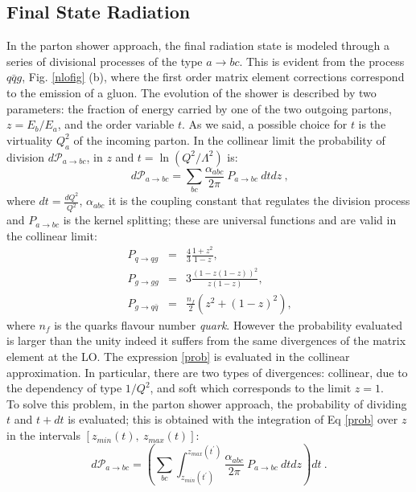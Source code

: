 \subsection*{Final State Radiation}
In the parton shower approach, the final radiation state is modeled through a series of divisional processes of the type $ a \rightarrow bc $.   
This is evident from the process $q \bar{q}g$, Fig. \ref{nlofig} (b), where the first order matrix element  corrections  correspond to the emission of a gluon. 
The evolution of the shower is described by two parameters: the fraction of energy carried by one of the two outgoing partons, $ z = E_b / E_a $, and the order variable $ t $. As we said, a possible choice for $ t $ is the  virtuality $ Q_a^2 $ of the incoming parton.
In the  collinear limit the probability of division $d \mathcal{P}_{a \rightarrow bc}$, in  $z$ and $t=\ln(Q^2/\Lambda^2)$ is:
\begin{equation}
 d \mathcal{P}_{a \rightarrow bc}= \sum_{bc} \frac{\alpha_{abc}}{2 \pi}\: {P}_{a \rightarrow bc} \:dt dz  \: \mbox{,} \label{prob}  \end{equation}
where $dt=\frac{d Q^2}{Q^2}$, $\alpha_{abc}$ it is the coupling constant that regulates the division process and  ${P}_{a \rightarrow bc}$ is the kernel splitting; these are universal functions and are valid in the collinear limit:
\begin{eqnarray}
P_{q \rightarrow qg    }&=& \frac{4}{3} \frac{1+z^2}{1-z} \mbox{,} \nonumber \\ 
 P_{g \rightarrow gg }&=& 3 \frac{(1-z(1-z))^2}{z(1-z)}    \mbox{,} \\ 
P_{g \rightarrow q\bar{q} }&=& \frac{n_f}{2} (z^2+ (1-z)^2)   \mbox{,} \nonumber \end{eqnarray}
where $n_f$ is the quarks flavour number \textit{quark}.
However the probability  evaluated is larger than the unity indeed it suffers from the same divergences of the matrix element at the LO. 
The expression \ref{prob} is evaluated in the collinear approximation. 
In particular, there are two types of divergences: collinear, due to the dependency of type $ 1 / Q^2 $, and soft which corresponds to the limit $ z = 1 $. \\
To solve this problem, in the parton shower approach, the probability of dividing $ t $ and $ t + dt $ is evaluated; this is obtained with the integration of Eq \ref{prob} over  $z$ in the intervals  $[z_{min}(t), \: z_{max}(t)]$:
\begin{equation}
 d \mathcal{P}_{a \rightarrow bc}= \left( \sum_{bc} \int_{z_{min}(t^{'})}^{{z_{max}(t^{'})}}  \frac{\alpha_{abc}}{2 \pi}\: {P}_{a \rightarrow bc} \:dt dz \right) dt  \: \mbox{.}   \end{equation}
